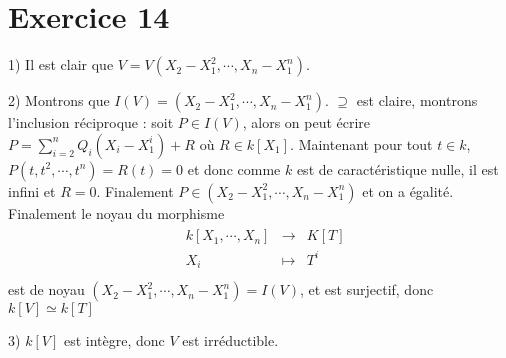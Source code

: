     \section{Exercice 14}
        \begin{question}{1)}
            Il est clair que $V = V(X_2 - X_1^2, \cdots, X_n - X_1^n)$.
        \end{question}
        \begin{question}{2)}
            Montrons que $I(V) = (X_2 - X_1^2, \cdots, X_n - X_1^n)$. $\supseteq$ est claire, montrons l'inclusion réciproque : soit $P \in I(V)$, alors on peut écrire $P = \sum_{i = 2}^n Q_i (X_i - X_1^i) + R$
            où $R \in k[X_1]$. Maintenant pour tout $t \in k$, $P(t, t^2, \cdots, t^n) = R(t) = 0$ et donc comme $k$ est de caractéristique nulle, il est infini et $R = 0$. Finalement $P \in (X_2 - X_1^2, \cdots, X_n - X_1^n)$ et on a égalité. Finalement le noyau du morphisme
            \begin{align*}
                \begin{array}{cccc}
                    & k[X_1, \cdots, X_n] & \to & K[T] \\
                    & X_i & \mapsto & T^i\\
                \end{array}
            \end{align*}
            est de noyau $(X_2 - X_1^2, \cdots, X_n - X_1^n) = I(V)$, et est surjectif, donc $k[V] \simeq k[T]$
        \end{question}
        \begin{question}{3)}
            $k[V]$ est intègre, donc $V$ est irréductible.
        \end{question}

